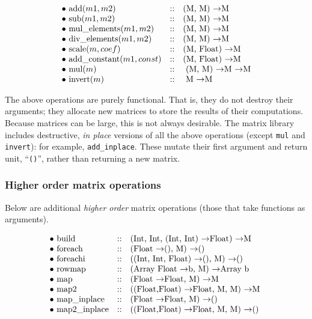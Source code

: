 \[
\begin{array}{lcl}
\bullet$ $ $add$(m1, m2)           & :: &  $(M, M)          \ra   M$ \\
\bullet$ $ $sub$(m1, m2)           & :: &  $(M, M)          \ra   M$ \\
\bullet$ $ $mul\_elements$(m1, m2) & :: &  $(M, M)          \ra   M$ \\
\bullet$ $ $div\_elements$(m1, m2) & :: &  $(M, M)          \ra   M$ \\
\bullet$ $ $scale$(m, coef)        & :: &  $(M, Float)           \ra   M$ \\
\bullet$ $ $add\_constant$(m1, const) & :: &  $(M, Float)        \ra   M$ \\
\bullet$ $ $mul$(m)                & :: &  $ (M, M) \ra M  \ra   M$ \\
\bullet$ $ $invert$(m)             & :: &  $ M                   \ra   M$ \\
\end{array}
\]

The above operations are purely functional.  That is, they do not
destroy their arguments; they allocate new matrices to store the
results of their computations.  Because matrices can be large, this is
not always desirable.  The matrix library includes destructive, {\em
in place} versions of all the above operations (except {\tt mul} and
{\tt invert}): for example, {\tt add\_inplace}.  These mutate their
first argument and return unit, ``{\tt ()}'', rather than returning a
new matrix.

\subsubsection{Higher order matrix operations}

Below are additional {\em higher order} matrix operations (those that
take functions as arguments).

\[
\begin{array}{lcl}
\bullet$ $ $build$    & :: & $(Int, Int, (Int, Int) \ra Float) \ra M  $ \\
\bullet$ $ $foreach$  & :: & $(Float \ra (), M) \ra ()   $ \\
\bullet$ $ $foreachi$     & :: & $((Int, Int, Float) \ra (), M) \ra ()   $ \\
\bullet$ $ $rowmap$       & :: & $(Array Float \ra b, M) \ra Array b     $ \\
\bullet$ $ $map$          & :: & $(Float \ra Float, M) \ra M  $ \\
\bullet$ $ $map2$         & :: & $((Float,Float) \ra Float, M, M) \ra M  $  \\
\bullet$ $ $map\_inplace$  & :: & $(Float \ra Float, M) \ra ()           $ \\
\bullet$ $ $map2\_inplace$ & :: & $((Float,Float) \ra Float, M, M) \ra ()    $\\
\end{array}
\]

